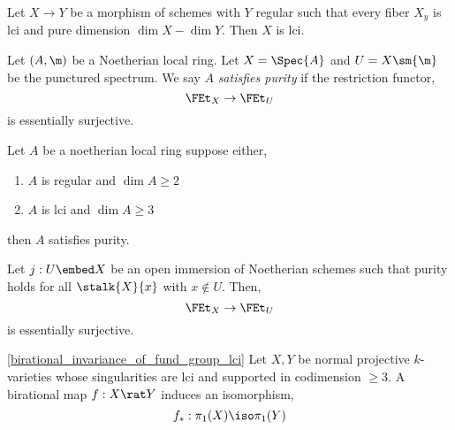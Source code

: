 \documentclass[12pt]{article}
\begin{document}
\begin{cor} \label{lci_fibers_total_space_lci}
Let $X \to Y$ be a morphism of schemes with $Y$ regular such that every fiber $X_y$ is lci and pure dimension $\dim{X} - \dim{Y}$. Then $X$ is lci. 
\end{cor}

\begin{defn}
Let $(A, \m)$ be a Noetherian local ring. Let $X = \Spec{A}$ and $U = X \sm \{ \m \}$ be the punctured spectrum. We say $A$ \textit{satisfies purity} if the restriction functor,
\[ \FEt_X \to \FEt_{U} \]
is essentially surjective. 
\end{defn}

\begin{theorem}
Let $A$ be a noetherian local ring suppose either,
\begin{enumerate}
\item $A$ is regular and $\dim{A} \ge 2$
\item $A$ is lci and $\dim{A} \ge 3$
\end{enumerate}
then $A$ satisfies purity. 
\end{theorem}

\begin{lemma}
Let $j : U \embed X$ be an open immersion of Noetherian schemes such that purity holds for all $\stalk{X}{x}$ with $x \notin U$. Then,
\[ \FEt_X \to \FEt_U \]
is essentially surjective. 
\end{lemma}

\begin{lemma} \ref{birational_invariance_of_fund_group_lci}
Let $X, Y$ be normal projective $k$-varieties whose singularities are lci and supported in codimension $\ge 3$. A birational map $f : X \rat Y$ induces an isomorphism,
\[ f_* : \pi_1(X) \iso \pi_1(Y) \]
\end{lemma}

\newcommand{\dom}[1]{\mathrm{dom} \left( #1 \right)}
\end{document}
